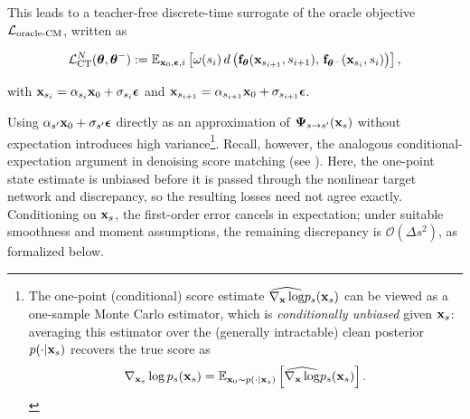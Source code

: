 This leads to a teacher-free discrete-time surrogate of the oracle objective $\mathcal{L}_{\mathrm{oracle}\text{-}\mathrm{CM}}$, written as
\begin{mdframed}
\begin{align}\label{eq:ct-discrete-approx-N}
    \mathcal{L}_{\text{CT}}^N(\bm{\theta}, \bm{\theta}^-) 
    := \mathbb{E}_{{\mathbf{x}}_0, {\bm{\epsilon}}, i} \left[ 
       \omega(s_i)\, d \left({\mathbf{f}}_{\bm{\theta}}({\mathbf{x}}_{s_{i+1}}, s_{i+1}),\, 
       {\mathbf{f}}_{\bm{\theta}^-}({\mathbf{x}}_{s_i}, s_i)\right)
    \right],
\end{align}
\end{mdframed}
with ${\mathbf{x}}_{s_i} = \alpha_{s_i}{\mathbf{x}}_0 + \sigma_{s_i}{\bm{\epsilon}}$ and ${\mathbf{x}}_{s_{i+1}} = \alpha_{s_{i+1}}{\mathbf{x}}_0 + \sigma_{s_{i+1}}{\bm{\epsilon}}$.

Using $\alpha_{s'}{\mathbf{x}}_0+\sigma_{s'}{\bm{\epsilon}}$ directly as an approximation of ${\bm{\Psi}}_{s\to s'}({\mathbf{x}}_s)$ without expectation introduces high variance\footnote{The one-point (conditional) score estimate $\widehat{\nabla_{{\mathbf{x}}}\log}p_s({\mathbf{x}}_s)$ can be viewed as a one-sample Monte Carlo estimator, which is \emph{conditionally unbiased} given ${\mathbf{x}}_s$: averaging this estimator over the (generally intractable) clean posterior $p(\cdot|{\mathbf{x}}_s)$ recovers the true score as
\[
\nabla_{{\mathbf{x}}_s}\log p_s({\mathbf{x}}_s)
= \mathbb{E}_{{\mathbf{x}}_0\sim p(\cdot|{\mathbf{x}}_s)}
 \left[\widehat{\nabla_{{\mathbf{x}}}\log}p_s({\mathbf{x}}_s)\right].
\]}. 
Recall, however, the analogous conditional-expectation argument in denoising
score matching (see ). Here, the one-point state
estimate is unbiased before it is passed through the nonlinear target network
and discrepancy, so the resulting losses need not agree exactly. Conditioning
on ${\mathbf{x}}_s$, the first-order error cancels in expectation; under suitable
smoothness and moment assumptions, the remaining discrepancy is
$\mathcal{O}(\Delta s^2)$, as formalized below.


